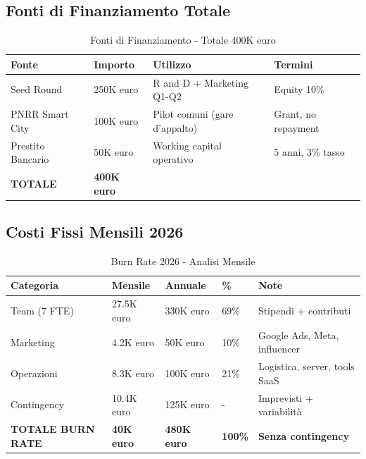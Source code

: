 \documentclass[11pt,a4paper]{report}
\begin{document}
\subsection{Fonti di Finanziamento Totale}
\begin{table}[H]
\centering
\caption{Fonti di Finanziamento - Totale 400K euro}
\label{tab:funding-sources}
\begin{tabular}{L{3.5cm} C{2cm} L{4cm} L{3cm}}
\toprule
{\bf Fonte} & {\bf Importo} & {\bf Utilizzo} & {\bf Termini} \\
\midrule
Seed Round & 250K euro & R and D + Marketing Q1-Q2 & Equity 10\% \\
PNRR Smart City & 100K euro & Pilot comuni (gare d'appalto) & Grant, no repayment \\
Prestito Bancario & 50K euro & Working capital operativo & 5 anni, 3\% tasso \\
\midrule
{\bf TOTALE} & {\bf 400K euro} & & \\
\bottomrule
\end{tabular}
\end{table}

\subsection{Costi Fissi Mensili 2026}
\begin{table}[H]
\centering
\caption{Burn Rate 2026 - Analisi Mensile}
\label{tab:burn-rate}
\begin{tabular}{L{2.5cm} C{1.5cm} C{1.5cm} C{1.5cm} C{1.5cm}}
\toprule
{\bf Categoria} & {\bf Mensile} & {\bf Annuale} & {\bf \%} & {\bf Note} \\
\midrule
Team (7 FTE) & 27.5K euro & 330K euro & 69\% & Stipendi + contributi \\
Marketing & 4.2K euro & 50K euro & 10\% & Google Ads, Meta, influencer \\
Operazioni & 8.3K euro & 100K euro & 21\% & Logistica, server, tools SaaS \\
Contingency & 10.4K euro & 125K euro & - & Imprevisti + variabilità \\
\midrule
{\bf TOTALE BURN RATE} & {\bf 40K euro} & {\bf 480K euro} & {\bf 100\%} & {\bf Senza contingency} \\
\bottomrule
\end{tabular}
\end{table}
\end{document}
